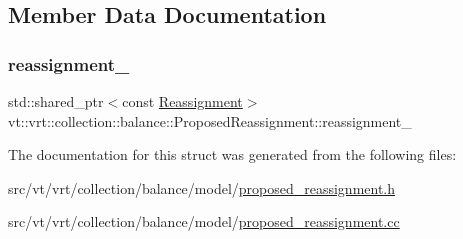 \subsection{Member Data Documentation}
\mbox{\label{structvt_1_1vrt_1_1collection_1_1balance_1_1_proposed_reassignment_a923fcc247c401b766417f1e87009cb00}} 
\subsubsection{\texorpdfstring{reassignment\+\_\+}{reassignment\_}}
{\footnotesize\ttfamily std\+::shared\+\_\+ptr$<$const \hyperlink{structvt_1_1vrt_1_1collection_1_1balance_1_1_reassignment}{Reassignment}$>$ vt\+::vrt\+::collection\+::balance\+::\+Proposed\+Reassignment\+::reassignment\+\_\+\hspace{0.3cm}{\ttfamily [private]}}



The documentation for this struct was generated from the following files\+:\begin{DoxyCompactItemize}
\item 
src/vt/vrt/collection/balance/model/\hyperlink{proposed__reassignment_8h}{proposed\+\_\+reassignment.\+h}\item 
src/vt/vrt/collection/balance/model/\hyperlink{proposed__reassignment_8cc}{proposed\+\_\+reassignment.\+cc}\end{DoxyCompactItemize}
